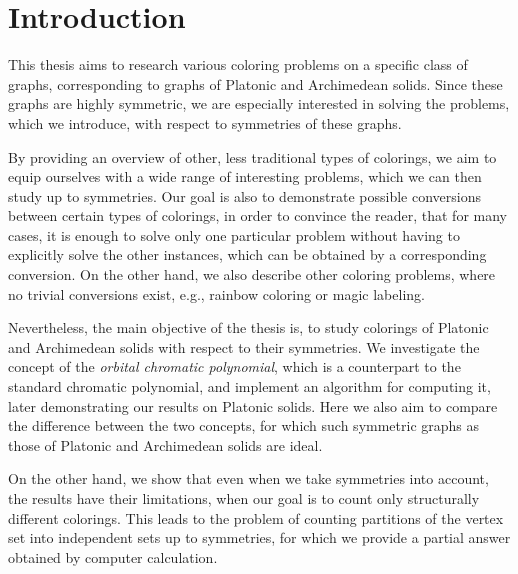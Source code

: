 \chapter*{Introduction}

This thesis aims to research various coloring problems on a specific class of graphs, corresponding to graphs of Platonic and Archimedean solids. Since these graphs are highly symmetric, we are especially interested in solving the problems, which we introduce, with respect to symmetries of these graphs. 

By providing an overview of other, less traditional types of colorings, we aim to equip ourselves with a wide range of interesting problems, which we can then study up to symmetries. Our goal is also to demonstrate possible conversions between certain types of colorings, in order to convince the reader, that for many cases, it is enough to solve only one particular problem without having to explicitly solve the other instances, which can be obtained by a corresponding conversion. On the other hand, we also describe other coloring problems, where no trivial conversions exist, e.g., rainbow coloring or magic labeling.

Nevertheless, the main objective of the thesis is, to study colorings of Platonic and Archimedean solids with respect to their symmetries. We investigate the concept of the \emph{orbital chromatic polynomial}, which is a counterpart to the standard chromatic polynomial, and implement an algorithm for computing it, later demonstrating our results on Platonic solids. Here we also aim to compare the difference between the two concepts, for which such symmetric graphs as those of Platonic and Archimedean solids are ideal.

On the other hand, we show that even when we take symmetries into account, the results have their limitations, when our goal is to count only structurally different colorings. This leads to the problem of counting partitions of the vertex set into independent sets up to symmetries, for which we provide a partial answer obtained by computer calculation.